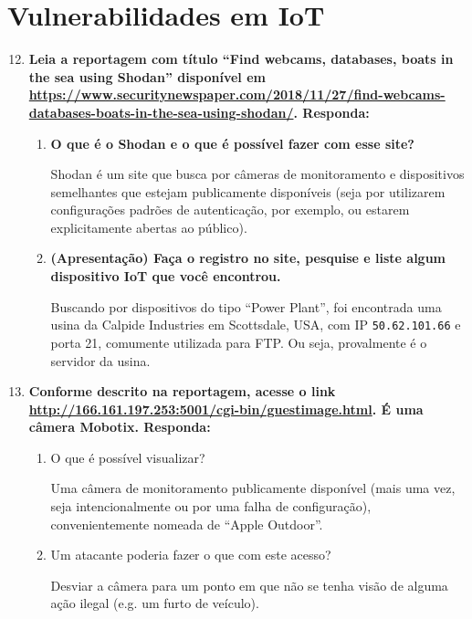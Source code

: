 \documentclass{article}
\newcommand{\code}[1]{\texttt{#1}}
\begin{document}
    \section{Vulnerabilidades em IoT}

    \begin{enumerate}
        \setcounter{enumi}{11}
        \item \textbf{Leia a reportagem com título ``Find webcams, databases,
            boats in the sea using Shodan'' disponível em
            \url{https://www.securitynewspaper.com/2018/11/27/find-webcams-databases-boats-in-the-sea-using-shodan/}.
            Responda:}

            \begin{enumerate}
                \item \textbf{O que é o Shodan e o que é possível fazer com esse site?}

                    Shodan é um site que busca por câmeras de monitoramento e
                    dispositivos semelhantes que estejam publicamente
                    disponíveis (seja por utilizarem configurações padrões de
                    autenticação, por exemplo, ou estarem explicitamente
                    abertas ao público).

                \item \textbf{(Apresentação) Faça o registro no site, pesquise
                    e liste algum dispositivo IoT que você encontrou.}

                    Buscando por dispositivos do tipo ``Power Plant'', foi
                    encontrada uma usina da Calpide Industries em Scottsdale,
                    USA, com IP \code{50.62.101.66} e porta 21, comumente
                    utilizada para FTP. Ou seja, provalmente é o servidor da
                    usina.
            \end{enumerate}

        \item \textbf{Conforme descrito na reportagem, acesse o link
            \url{http://166.161.197.253:5001/cgi-bin/guestimage.html}. É uma
            câmera Mobotix. Responda:}

            \begin{enumerate}
                \item O que é possível visualizar?

                    Uma câmera de monitoramento publicamente disponível (mais
                    uma vez, seja intencionalmente ou por uma falha de
                    configuração), convenientemente nomeada de ``Apple
                    Outdoor''. 

                \item Um atacante poderia fazer o que com este acesso?

                    Desviar a câmera para um ponto em que não se tenha visão de
                    alguma ação ilegal (e.g. um furto de veículo).
            \end{enumerate}
    \end{enumerate}
\end{document}
